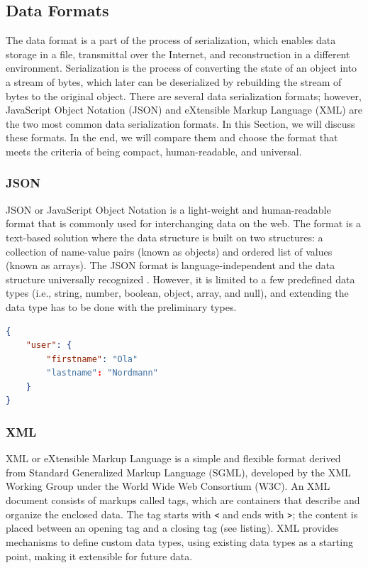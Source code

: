 \subsection{Data Formats}

The data format is a part of the process of serialization, which enables data storage in a file, transmittal over the Internet, and reconstruction in a different environment. Serialization is the process of converting the state of an object into a stream of bytes, which later can be deserialized by rebuilding the stream of bytes to the original object. There are several data serialization formats; however, JavaScript Object Notation (JSON) and eXtensible Markup Language (XML) are the two most common data serialization formats. In this Section, we will discuss these formats. In the end, we will compare them and choose the format that meets the criteria of being compact, human-readable, and universal. 

\subsubsection{JSON}
JSON or JavaScript Object Notation is a light-weight and human-readable format that is commonly used for interchanging data on the web. The format is a text-based solution where the data structure is built on two structures: a collection of name-value pairs (known as objects) and ordered list of values (known as arrays). The JSON format is language-independent and the data structure universally recognized \cite{jsonorg, jsonvxml}. However, it is limited to a few predefined data types (i.e., string, number, boolean, object, array, and null), and extending the data type has to be done with the preliminary types. 

\begin{lstlisting}[language=json, caption={My Caption}, captionpos=b]
{
    "user": {
        "firstname": "Ola"
        "lastname": "Nordmann"
    }
}
\end{lstlisting}

\subsubsection{XML}
XML or eXtensible Markup Language is a simple and flexible format derived from Standard Generalized Markup Language (SGML), developed by the XML Working Group under the World Wide Web Consortium (W3C). An XML document consists of markups called tags, which are containers that describe and organize the enclosed data. The tag starts with \verb|<| and ends with \verb|>|; the content is placed between an opening tag and a closing tag (see listing). \cite{w3xml, jsonvxml} XML provides mechanisms to define custom data types, using existing data types as a starting point, making it extensible for future data. 


